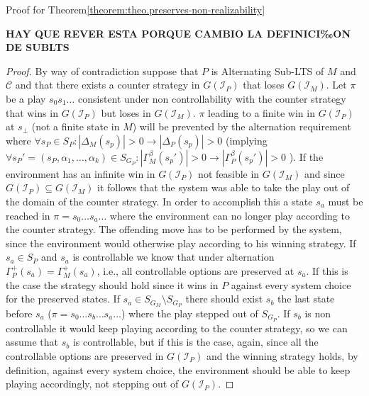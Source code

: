 Proof for Theorem\ref{theorem:theo.preserves-non-realizability}

\textbf{HAY QUE REVER ESTA PORQUE CAMBIO LA DEFINICI‰ON DE SUBLTS}
\begin{proof}
By way of contradiction suppose that 
$P$ is Alternating Sub-LTS of $M$ and $\mathcal{C}$ and that there
exists a counter strategy in $G(\mathcal{I}_P)$ that loses
$G(\mathcal{I}_M)$.
 Let $\pi$ be a play 
$s_0 s_1 \ldots$ consistent under non controllability with
the counter strategy that wins in $G(\mathcal{I}_P)$ but loses in $G(\mathcal{I}_M)$. 
$\pi$ leading to a finite win in $G(\mathcal{I}_P)$ at $s_{\bot}$
(not a finite state in $M$) will be prevented by the
alternation requirement where 
$\forall s_P \in S_P: |\Delta_M(s_p)| > 0 \rightarrow |\Delta_P(s_p)| > 0$ 
(implying $\forall s_P\prime=(s_P,\alpha_1,\ldots,\alpha_k) \in S_{G_P}: |\Gamma^{\beta}_M(s_p\prime)| > 0 \rightarrow |\Gamma^{\beta}_P(s_p\prime)| > 0$ ).  
If the environment has an infinite
win in $G(\mathcal{I}_P)$ not feasible in $G(\mathcal{I}_M)$ and since $G(\mathcal{I}_P) \subseteq G(\mathcal{I}_M)$
it follows that the system was able to take the play
out of the domain of the counter strategy.  In order
to accomplish this a state $s_a$ must be reached in
$\pi = s_0  \ldots s_a  \ldots$ where the environment
can no longer play according to the counter strategy.
The offending move has to be performed by the system, since
the environment would otherwise play according to his
winning strategy.
If $s_a \in S_P$ and $s_a$ is controllable we know that
under alternation $\Gamma^{+}_P(s_a) = \Gamma^{+}_M(s_a)$, i.e., all controllable options are
preserved at $s_a$.  If this is the case the strategy should
hold since it wins in $P$ against every system choice for
the preserved states.  
If $s_a \in S_{G_M} \setminus S_{G_P}$ there should exist $s_b$ 
the last state before $s_a$ ($\pi = s_0 \ldots s_b \ldots s_a \ldots$)
where the play stepped out of $S_{G_P}$.  If $s_b$ is non controllable
it would keep playing according to the counter strategy, 
so we can assume that $s_b$ is controllable, but if this is
the case, again, since all the controllable options are
preserved in $G(\mathcal{I}_P)$ and the winning strategy holds, by definition,
against every system choice, the environment should be able
to keep playing accordingly, not stepping out of $G(\mathcal{I}_P)$.  
\end{proof}